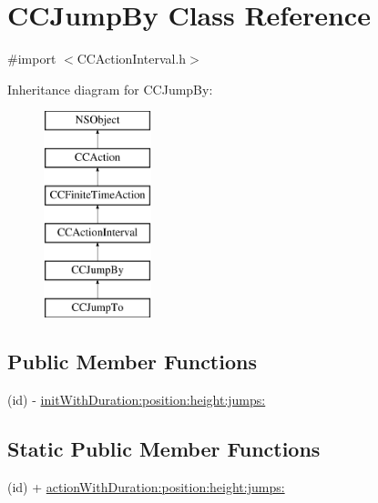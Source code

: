 \hypertarget{interface_c_c_jump_by}{\section{C\-C\-Jump\-By Class Reference}
\label{interface_c_c_jump_by}
}


{\ttfamily \#import $<$C\-C\-Action\-Interval.\-h$>$}

Inheritance diagram for C\-C\-Jump\-By\-:\begin{figure}[H]
\begin{center}
\leavevmode
\includegraphics[height=6.000000cm]{interface_c_c_jump_by}
\end{center}
\end{figure}
\subsection*{Public Member Functions}
\begin{DoxyCompactItemize}
\item 
(id) -\/ \hyperlink{interface_c_c_jump_by_ad94b2075916a71183cc339be8e0e5660}{init\-With\-Duration\-:position\-:height\-:jumps\-:}
\end{DoxyCompactItemize}
\subsection*{Static Public Member Functions}
\begin{DoxyCompactItemize}
\item 
(id) + \hyperlink{interface_c_c_jump_by_ad59992b4e3b9198ed78a6ff4539000fa}{action\-With\-Duration\-:position\-:height\-:jumps\-:}
\end{DoxyCompactItemize}
